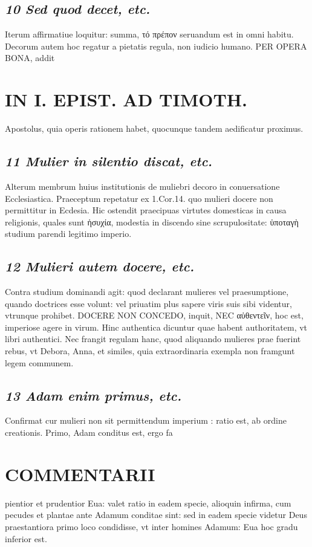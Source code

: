 \documentclass{article}
\begin{document}
\begin{pages}
\subsection*{\textit{10 Sed quod decet, etc. }}\pstart Iterum affirmatiue loquitur: summa, τό πρέπον seruandum est in omni habitu. Decorum autem hoc regatur a pietatis regula, non iudicio humano. PER OPERA BONA, addit  \pend
\section*{IN I. EPIST. AD TIMOTH. }
\marginpar{[ p.57 ]}\pstart Apostolus, quia operis rationem habet, quocunque tandem aedificatur proximus.  \pend
{}
{}
\subsection*{\textit{11 Mulier in silentio discat, etc. }}\pstart Alterum membrum huius institutionis de muliebri decoro in conuersatione Ecclesiastica. Praeceptum repetatur ex 1.Cor.14. quo mulieri docere non permittitur in Ecdesia. Hic ostendit praecipuas virtutes domesticas in causa religionis, quales sunt ἡσυχία, modestia in discendo sine scrupulositate: ὑποταγὴ studium parendi legitimo imperio.  \pend
{}
{}
\subsection*{\textit{12 Mulieri autem docere, etc. }}\pstart Contra studium dominandi agit: quod declarant mulieres vel praesumptione, quando doctrices esse volunt: vel priuatim plus sapere viris suis sibi videntur, vtrunque prohibet. DOCERE NON CONCEDO, inquit, NEC αὐθεντεῖν, hoc est, imperiose agere in virum. Hinc authentica dicuntur quae habent authoritatem, vt libri authentici. Nec frangit regulam hanc, quod aliquando mulieres prae fuerint rebus, vt Debora, Anna, et similes, quia extraordinaria exempla non framgunt legem communem.  \pend
{}
{}
\subsection*{\textit{13 Adam enim primus, etc. }}\pstart Confirmat cur mulieri non sit permittendum imperium : ratio est, ab ordine creationis. Primo, Adam conditus est, ergo fa\pend
\section*{COMMENTARII }
\marginpar{[ p.58 ]}\pstart pientior et prudentior Eua: valet ratio in eadem specie, alioquin infirma, cum pecudes et plantae ante Adamum conditae sint: sed in eadem specie videtur Deus praestantiora primo loco condidisse, vt inter homines Adamum: Eua hoc gradu inferior est.  \pend
{}
{}

\end{pages}
\end{document}

